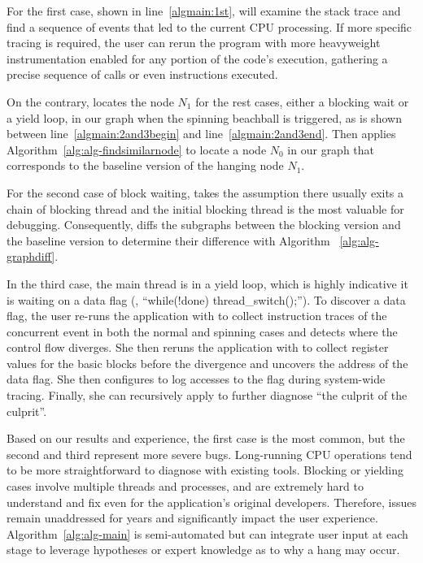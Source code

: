 For the first case, shown in line~\ref{algmain:1st}, \xxx will examine
the stack trace and find a sequence of events that led to the current CPU
processing. If more specific tracing is required, the user can rerun the
program with more heavyweight instrumentation enabled for any portion of the
code's execution, gathering a precise sequence of calls or even instructions
executed.

On the contrary, \xxx locates the node $N_1$ for the rest
cases, either a blocking wait or a yield loop, in our graph
when the spinning beachball is triggered, as is shown between
line~\ref{algmain:2and3begin} and line~\ref{algmain:2and3end}. Then \xxx applies
Algorithm~\ref{alg:alg-findsimilarnode} to locate a node $N_0$ in our graph that
corresponds to the baseline version of the hanging node $N_1$.

For the second case of block waiting, \xxx takes the assumption there usually
exits a chain of blocking thread and the initial blocking thread is the most
valuable for debugging. Consequently, \xxx diffs the subgraphs between the
blocking version and the baseline version to determine their difference with
Algorithm ~\ref{alg:alg-graphdiff}.

In the third case, the main thread is in a yield loop, which is highly indicative it is
waiting on a data flag (\eg, ``while(!done) thread\_switch();''). To discover
a data flag, the user re-runs the application with \xxx to collect instruction
traces of the concurrent event in both the normal and spinning cases and detects
where the control flow diverges. She then reruns the application with \xxx to
collect register values for the basic blocks before the divergence and uncovers
the address of the data flag. She then configures \xxx to log accesses to the
flag during system-wide tracing. Finally, she can recursively apply \xxx to
further diagnose ``the culprit of the culprit''.

Based on our results and experience, the first case is the most common, but
the second and third represent more severe bugs. Long-running CPU operations
tend to be more straightforward to diagnose with existing tools. Blocking
or yielding cases involve multiple threads and processes, and are extremely
hard to understand and fix even for the application's original developers.
Therefore, issues remain unaddressed for years and significantly impact the user
experience. Algorithm~\ref{alg:alg-main} is semi-automated but can integrate
user input at each stage to leverage hypotheses or expert knowledge as to why a
hang may occur.

